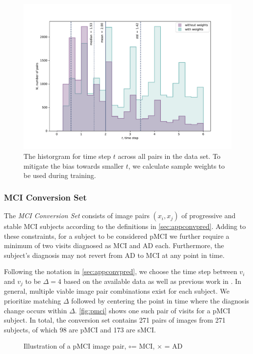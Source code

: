 \begin{figure}[h]
	\centering
	\includegraphics[width=\linewidth]{images/timestep_plots/hist} 
	\caption{The historgram for time step $t$ across all pairs in the data set. To mitigate the bias towards smaller $t$, we calculate sample weights to be used during training.}
	\label{fig:timestephist}
\end{figure}


\subsubsection*{MCI Conversion Set} \label{sec:datconv}
The \textit{MCI Conversion Set} consists of image pairs $(x_i, x_j)$ of progressive and stable MCI subjects according to the definitions in \autoref{sec:appconvpred}. Adding to these constraints, for a subject to be considered pMCI we further require a minimum of two visits diagnosed as MCI and AD each. Furthermore, the subject's diagnosis may not revert from AD to MCI at any point in time.

Following the notation in \ref{sec:appconvpred}, we choose the time step between $v_i$ and $v_j$ to be $\Delta = 4$ based on the available data as well as previous work in \cite{wegmayr}. In general, multiple viable image pair combinations exist for each subject. We prioritize matching $\Delta$ followed by centering the point in time where the diagnosis change occurs within $\Delta$. \autoref{fig:pmci} shows one such pair of visits for a pMCI subject. In total, the conversion set contains 271 pairs of images from 271 subjects, of which 98 are pMCI and 173 are sMCI.

\begin{figure}[h]
	\centering
	
	\caption{Illustration of a pMCI image pair, \Large$\circ$\normalsize\;= MCI, $\times$ = AD}
	\label{fig:pmci}
\end{figure}

